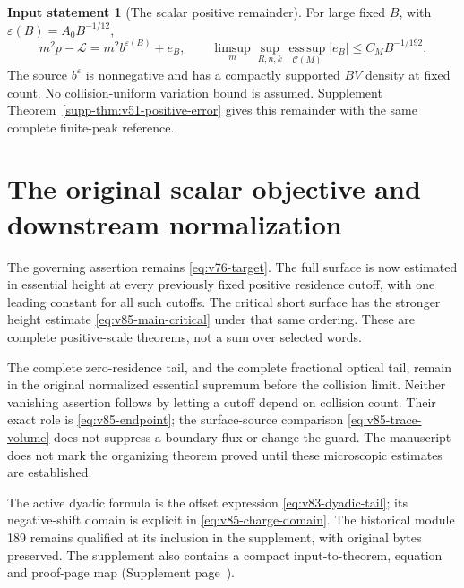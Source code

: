 \documentclass[11pt,reqno]{amsart}
\numberwithin{equation}{section}
\theoremstyle{definition}
\newtheorem{inputstatement}[theorem]{Input statement}
\theoremstyle{remark}\newtheorem{remark}[theorem]{Remark}
\newcommand{\esssup}{\operatorname*{ess\,sup}}
\begin{document}
\begin{inputstatement}[The scalar positive remainder]
\label{input:v83-scalar}
For large fixed $B$, with $\varepsilon(B)=A_0B^{-1/12}$,
\begin{equation}\label{eq:v76-remainder}
 m^2p-\mathcal L=m^2b^{\varepsilon(B)}+e_B,\qquad
 \limsup_m\sup_{R,n,k}\esssup_{\mathcal C(M)}|e_B|
                                      \le C_MB^{-1/192}.
\end{equation}
The source $b^\varepsilon$ is nonnegative and has a compactly supported
$BV$ density at fixed count. No collision-uniform variation bound is
assumed. Supplement Theorem~\ref{supp-thm:v51-positive-error} gives
this remainder with the same complete finite-peak reference.
\end{inputstatement}










\section{The original scalar objective and downstream normalization}
The governing assertion remains \eqref{eq:v76-target}. The full
surface is now estimated in essential height at every previously fixed
positive residence cutoff, with one leading constant for all such
cutoffs. The critical short surface has the stronger height estimate
\eqref{eq:v85-main-critical} under that same ordering. These are
complete positive-scale theorems, not a sum over selected words.

The complete zero-residence tail, and the complete fractional optical
tail, remain in the original normalized essential supremum before the
collision limit. Neither vanishing assertion follows by letting a
cutoff depend on collision count. Their exact role is
\eqref{eq:v85-endpoint}; the surface-source comparison
\eqref{eq:v85-trace-volume} does not suppress a boundary flux or change
the guard. The manuscript does not mark the organizing theorem proved
until these microscopic estimates are established.

The active dyadic formula is the offset expression
\eqref{eq:v83-dyadic-tail}; its negative-shift domain is explicit in
\eqref{eq:v85-charge-domain}. The historical module 189 remains
qualified at its inclusion in the supplement, with original bytes
preserved. The supplement also contains a compact input-to-theorem,
equation and proof-page map (Supplement
page~\pageref{supp-v85:dependency-guide}).
\end{document}
